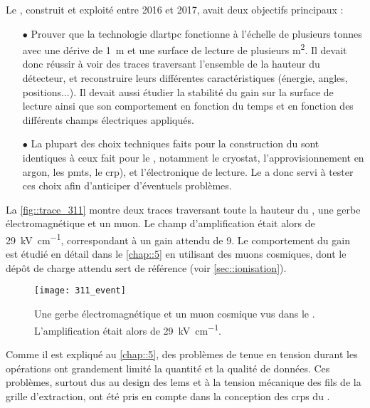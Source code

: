       Le \TOO{}, construit et exploité entre 2016 et 2017, avait deux objectifs principaux :
      \begin{itemize}
        \item[$\bullet$] Prouver que la technologie \gls{dlartpc} fonctionne à l'échelle de plusieurs tonnes avec une dérive de \SI{1}{\meter} et une surface de lecture de plusieurs \si{\meter\squared}. Il devait donc réussir à voir des traces traversant l'ensemble de la hauteur du détecteur, et reconstruire leurs différentes caractéristiques (énergie, angles, positions...). Il devait aussi étudier la stabilité du gain sur la surface de lecture ainsi que son comportement en fonction du temps et en fonction des différents champs électriques appliqués.
        \item[$\bullet$] La plupart des choix techniques faits pour la construction du \TOO{} sont identiques à ceux fait pour le \SSS{}, notamment le cryostat, l'approvisionnement en argon, les \glspl{pmt}, le \gls{crp}), et l'électronique de lecture. Le \TOO{} a donc servi à tester ces choix afin d'anticiper d'éventuels problèmes.
      \end{itemize}
      
      La \autoref{fig::trace_311} montre deux traces traversant toute la hauteur du \TOO{}, une gerbe électromagnétique et un muon. Le champ d'amplification était alors de \SI{29}{\kilo\volt\per\centi\meter}, correspondant à un gain attendu de 9. Le comportement du gain est étudié en détail dans le \autoref{chap::5} en utilisant des muons cosmiques, dont le dépôt de charge attendu sert de référence (voir \autoref{sec::ionisation}).

      \begin{figure}[htbp]
        \centering
        \texttt{[image: 311\_event]}        
        \caption[Quelques événements vus dans le  \TOO{}]{\label{fig::trace_311}Une gerbe électromagnétique et un muon cosmique vus dans le \TOO{}. L'amplification était alors de \SI{29}{\kilo\volt\per\centi\meter}.}
      \end{figure}

      Comme il est expliqué au \autoref{chap::5}, des problèmes de tenue en tension durant les opérations ont grandement limité la quantité et la qualité de données. Ces problèmes, surtout dus au design des \glspl{lem} et à la tension mécanique des fils de la grille d'extraction, ont été pris en compte dans la conception des \glspl{crp} du \SSS{}.

